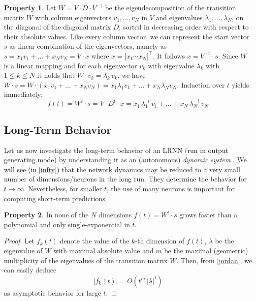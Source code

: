 \documentclass[twoside,11pt]{article}
\theoremstyle{definition}
\newtheorem{prop}{Property}
\begin{document}
\begin{prop}\label{eigen}
Let $W = V \cdot D \cdot V^{-1}$ be the eigendecomposition of the transition matrix $W$ with column
eigenvectors $v_1,\dots,v_N$ in $V$ and eigenvalues $\lambda_1, \dots, \lambda_N$,
on the diagonal of the diagonal matrix $D$, sorted in decreasing order with
respect to their absolute values. Like every column vector, we can represent the
start vector $s$ as linear combination of the eigenvectors, namely as $s =
x_1 v_1 + \dots + x_N v_N = V \cdot x$ where $x = \big[ x_1 \cdots x_N
\big]^\top$. It follows $x = V^{-1} \cdot s$.
Since $W$ is a linear mapping and for each eigenvector $v_k$ with eigenvalue
$\lambda_k$ with $1 \le k \le N$ it holds that $W \cdot v_k = \lambda_k\, v_k$, we
have $W \cdot s = W \cdot (x_1 v_1 + \dots + x_N v_N) = x_1 \lambda_1 v_1 +
\dots + x_N \lambda_N v_N$. Induction over $t$ yields immediately:
\begin{equation}\label{form}
	f(t) = W^t \cdot s = V \cdot D^t \cdot x =
	x_1\,{\lambda_1}^t\,v_1 + \dots + x_N\,{\lambda_N}^t\,v_N
\end{equation}
\end{prop}

\subsection{Long-Term Behavior}\label{ellipse}

Let us now investigate the long-term behavior of an LRNN (run in output generating
mode) by understanding it as an (autonomous) \emph{dynamic system} \citep{CK14,Str15}.
We will see (in \cref{infty}) that the network dynamics may be reduced to a
very small number of dimensions/neurons in the long run. They determine the behavior for $t
\to \infty$. Nevertheless, for smaller $t$, the use of many neurons is important
for computing short-term predictions.

\begin{prop}\label{exponential}
In none of the $N$ dimensions $f(t) = W^t \cdot s$ grows faster than a
polynomial and only single-exponential in $t$.
\end{prop}

\begin{proof}
Let $f_k(t)$ denote the value of the $k$-th dimension of $f(t)$, $\lambda$ be
the eigenvalue of $W$ with maximal absolute value and $m$ be the maximal (geometric)
multiplicity of the eigenvalues of the transition matrix $W$. Then, from
\cref{jordan}, we can easily deduce \[ |f_k(t)| = O(t^m\,|\lambda|^t) \]
as asymptotic behavior for large $t$.
\end{proof}
\end{document}
